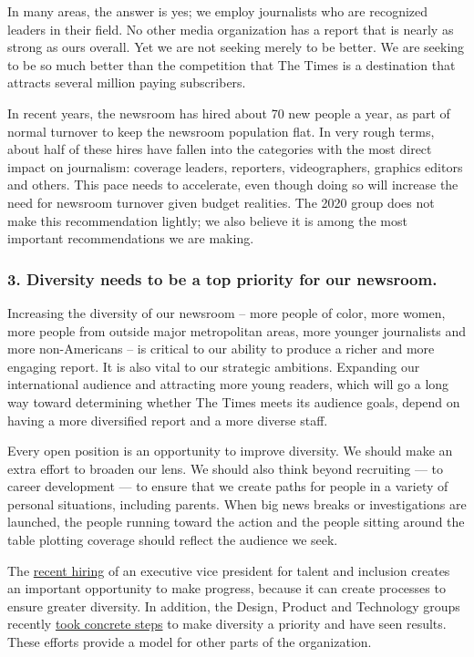 In many areas, the answer is yes; we employ journalists who are
recognized leaders in their field. No other media organization has a
report that is nearly as strong as ours overall. Yet we are not seeking
merely to be better. We are seeking to be so much better than the
competition that The Times is a destination that attracts several
million paying subscribers.

In recent years, the newsroom has hired about 70 new people a year, as
part of normal turnover to keep the newsroom population flat. In very
rough terms, about half of these hires have fallen into the categories
with the most direct impact on journalism: coverage leaders, reporters,
videographers, graphics editors and others. This pace needs to
accelerate, even though doing so will increase the need for newsroom
turnover given budget realities. The 2020 group does not make this
recommendation lightly; we also believe it is among the most important
recommendations we are making.

\hypertarget{3-diversity-needs-to-be-a-top-priority-for-our-newsroom}{%
\subsubsection{3. Diversity needs to be a top priority for our
newsroom.}\label{3-diversity-needs-to-be-a-top-priority-for-our-newsroom}}

Increasing the diversity of our newsroom -- more people of color, more
women, more people from outside major metropolitan areas, more younger
journalists and more non-Americans -- is critical to our ability to
produce a richer and more engaging report. It is also vital to our
strategic ambitions. Expanding our international audience and attracting
more young readers, which will go a long way toward determining whether
The Times meets its audience goals, depend on having a more diversified
report and a more diverse staff.

Every open position is an opportunity to improve diversity. We should
make an extra effort to broaden our lens. We should also think beyond
recruiting --- to career development --- to ensure that we create paths
for people in a variety of personal situations, including parents. When
big news breaks or investigations are launched, the people running
toward the action and the people sitting around the table plotting
coverage should reflect the audience we seek.

The
\href{http://investors.nytco.com/press/press-releases/press-release-details/2016/The-New-York-Times-Names-Ellen-Shultz-Executive-Vice-President-Talent-and-Inclusion/default.aspx}{recent
hiring} of an executive vice president for talent and inclusion creates
an important opportunity to make progress, because it can create
processes to ensure greater diversity. In addition, the Design, Product
and Technology groups recently
\href{http://www.nytco.com/a-note-from-kinsey-wilson-nytco-named-to-abis-2016-top-companies-for-women-technologists-leadership-index/}{took
concrete steps} to make diversity a priority and have seen results.
These efforts provide a model for other parts of the organization.


